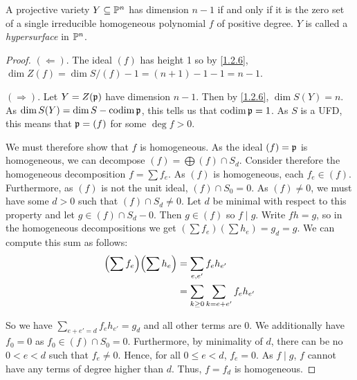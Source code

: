 \label{1.2.8}

A projective variety $Y \subseteq \P^n$ has dimension $n - 1$ if and only if it is the zero set of a single irreducible homogeneous polynomial $f$ of positive degree. $Y$ is called a \textit{hypersurface} in $\P^n$.

\begin{proof}
    $(\Longleftarrow)$. The ideal $(f)$ has height 1 so by \ref{1.2.6}, $\dim Z(f) = \dim S/(f) - 1 = (n + 1) - 1 - 1 = n - 1$.

    $(\Longrightarrow)$. Let $Y = Z(\p)$ have dimension $n - 1$. Then by \ref{1.2.6}, $\dim S(Y) = n$. As $\dim S(Y) = \dim S - \codim \p$, this tells us that $\codim \p = 1$. As $S$ is a UFD, this means that $\p = (f)$ for some $\deg f > 0$.

    We must therefore show that $f$ is homogeneous. As the ideal $(f) = \p$ is homogeneous, we can decompose $(f) = \bigoplus (f) \cap S_d$. Consider therefore the homogeneous decomposition $f = \sum f_e$. As $(f)$ is homogeneous, each $f_e \in (f)$. Furthermore, as $(f)$ is not the unit ideal, $(f) \cap S_0 = 0$. As $(f) \neq 0$, we must have some $d > 0$ such that $(f) \cap S_d \neq 0$. Let $d$ be minimal with respect to this property and let $g \in (f) \cap S_d - 0$. Then $g \in (f)$ so $f \mid g$. Write $fh = g$, so in the homogeneous decompositions we get $(\sum f_e) (\sum h_e) = g_d = g$. We can compute this sum as follows:
    \begin{align*}
        \parens{\sum f_e} \parens{\sum h_e} &= \sum_{e, e'} f_e h_{e'}\\
        &= \sum_{k \geq 0} \sum_{k = e + e'} f_e h_{e'}
    \end{align*}

    So we have $\sum_{e + e' = d} f_e h_{e'} = g_d$ and all other terms are $0$. We additionally have $f_0 = 0$ as $f_0 \in (f) \cap S_0 = 0$. Furthermore, by minimality of $d$, there can be no $0 < e < d$ such that $f_e \neq 0$. Hence, for all $0 \leq e < d$, $f_e = 0$. As $f \mid g$, $f$ cannot have any terms of degree higher than $d$. Thus, $f = f_d$ is homogeneous.
\end{proof}
